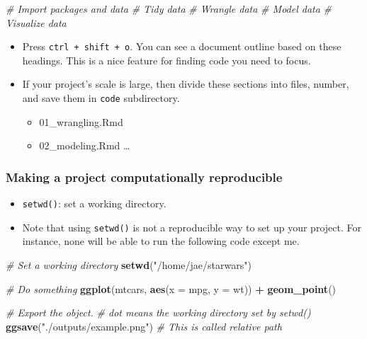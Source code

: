 \documentclass[
]{book}
\newenvironment{Shaded}{\begin{snugshade}}{\end{snugshade}}
\newcommand{\CommentTok}[1]{\textcolor[rgb]{0.56,0.35,0.01}{\textit{#1}}}
\newcommand{\DataTypeTok}[1]{\textcolor[rgb]{0.13,0.29,0.53}{#1}}
\newcommand{\KeywordTok}[1]{\textcolor[rgb]{0.13,0.29,0.53}{\textbf{#1}}}
\newcommand{\NormalTok}[1]{#1}
\newcommand{\OperatorTok}[1]{\textcolor[rgb]{0.81,0.36,0.00}{\textbf{#1}}}
\newcommand{\StringTok}[1]{\textcolor[rgb]{0.31,0.60,0.02}{#1}}
\providecommand{\tightlist}{%
  \setlength{\itemsep}{0pt}\setlength{\parskip}{0pt}}
\begin{document}
\begin{Shaded}
\begin{Highlighting}[]
\CommentTok{\# Import packages and data}
\CommentTok{\# Tidy data}
\CommentTok{\# Wrangle data}
\CommentTok{\# Model data}
\CommentTok{\# Visualize data}
\end{Highlighting}
\end{Shaded}

\begin{itemize}
\item
  Press \texttt{ctrl\ +\ shift\ +\ o}. You can see a document outline based on these headings. This is a nice feature for finding code you need to focus.
\item
  If your project's scale is large, then divide these sections into files, number, and save them in \texttt{code} subdirectory.

  \begin{itemize}
  \tightlist
  \item
    01\_wrangling.Rmd
  \item
    02\_modeling.Rmd
    \ldots{}
  \end{itemize}
\end{itemize}

\hypertarget{making-a-project-computationally-reproducible}{%
\subsubsection{Making a project computationally reproducible}\label{making-a-project-computationally-reproducible}}

\begin{itemize}
\item
  \texttt{setwd()}: set a working directory.
\item
  Note that using \texttt{setwd()} is not a reproducible way to set up your project. For instance, none will be able to run the following code except me.
\end{itemize}

\begin{Shaded}
\begin{Highlighting}[]
\CommentTok{\# Set a working directory }
\KeywordTok{setwd}\NormalTok{(}\StringTok{"/home/jae/starwars"}\NormalTok{)}

\CommentTok{\# Do something }
\KeywordTok{ggplot}\NormalTok{(mtcars, }\KeywordTok{aes}\NormalTok{(}\DataTypeTok{x =}\NormalTok{ mpg, }\DataTypeTok{y =}\NormalTok{ wt)) }\OperatorTok{+}
\StringTok{   }\KeywordTok{geom\_point}\NormalTok{()}

\CommentTok{\# Export the object. }
\CommentTok{\# dot means the working directory set by setwd()}
\KeywordTok{ggsave}\NormalTok{(}\StringTok{"./outputs/example.png"}\NormalTok{) }\CommentTok{\# This is called relative path }
\end{Highlighting}
\end{Shaded}
\end{document}
